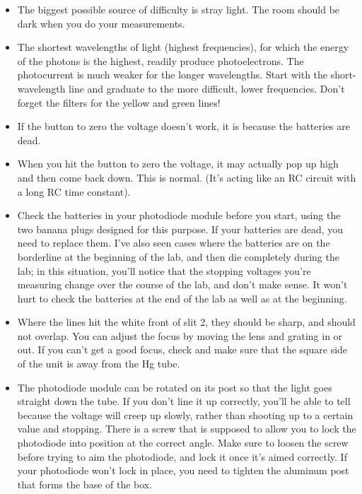 \begin{itemize}
\item[] The biggest possible source of difficulty is stray light.
The room should be dark when you do your measurements.

\item[] The shortest wavelengths of light (highest frequencies),
for which the energy of the photons is the highest, readily
produce photoelectrons. The photocurrent is much weaker for
the longer wavelengths. Start with the short-wavelength
line and graduate to the more difficult, lower frequencies.
Don't forget the filters for the yellow and green lines!

\item[] If the button to zero the voltage doesn't work, it is
because the batteries are dead.

\item[] When you hit the button to zero the voltage, it may actually
pop up high and then come back down. This is normal. (It's acting
like an RC circuit with a long RC time constant).

\item[] Check the batteries in your photodiode module before
you start, using the two banana plugs designed for this purpose.
If your batteries are dead, you need to replace them. I've also
seen cases where the batteries are on the borderline at the beginning
of the lab, and then die completely during the lab; in this
situation, you'll notice that the stopping voltages you're
measuring change over the course of the lab, and don't make
sense. It won't hurt to check the batteries at the end of the
lab as well as at the beginning.

\item[] Where the lines hit the white front of slit 2, they should
be sharp, and should not overlap. You can adjust the focus
by moving the lens and grating in or out. If you can't get a
good focus, check and make sure that the square side of the
unit is away from the Hg tube.

\item[] The photodiode module can be rotated on its post so that
the light goes straight down the tube. If you don't line it
up correctly, you'll be able to tell because the voltage
will creep up slowly, rather than shooting up to a certain
value and stopping. There is a screw that is supposed to
allow you to lock the photodiode into position at the
correct angle. Make sure to loosen the screw before trying
to aim the photodiode, and lock it once it's aimed
correctly. If your photodiode won't lock in place, you need
to tighten the aluminum post that forms the base of the box.
\end{itemize}

